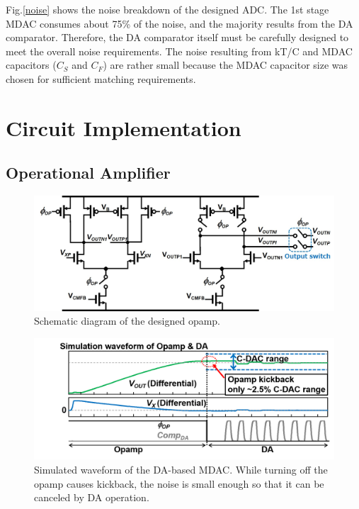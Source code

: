 Fig.\ref{noise} shows the noise breakdown of the designed ADC. The 1st stage MDAC consumes about 75\% of the noise, and the majority results from the DA comparator. Therefore, the DA comparator itself must be carefully designed to meet the overall noise requirements. The noise resulting from kT/C and MDAC capacitors ($C_S$ and $C_F$) are rather small because the MDAC capacitor size was chosen for sufficient matching requirements. 

\section{Circuit Implementation}
\subsection{Operational Amplifier}
\begin{figure}[!]
\centering
  \includegraphics[width=1\textwidth]{figure/chap2/opamp.jpg}
  \caption{Schematic diagram of the designed opamp.}
  \label{fig-opamp}
\end{figure}
\begin{figure}[!]
\centering
  \includegraphics[width=1\textwidth]{figure/chap2/opamp-sim.png}
  \caption{Simulated waveform of the DA-based MDAC. While turning off the opamp causes kickback, the noise is small enough so that it can be canceled by DA operation.}
  \label{fig-opamp-sim}
\end{figure}

